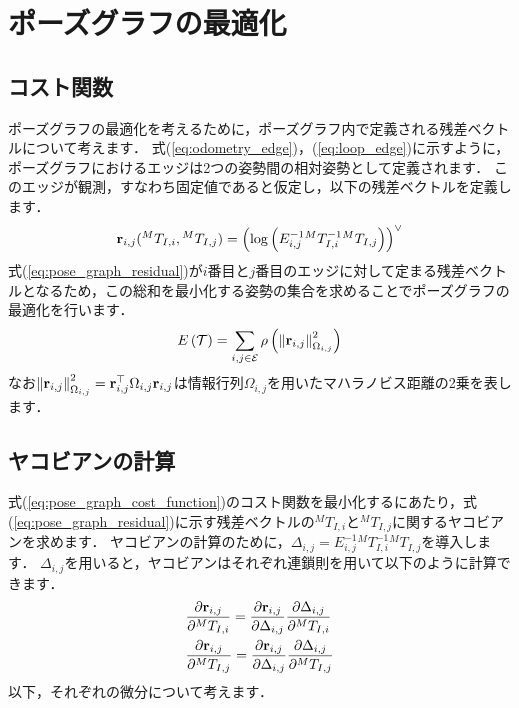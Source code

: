 \section{ポーズグラフの最適化}

\subsection{コスト関数}

ポーズグラフの最適化を考えるために，ポーズグラフ内で定義される残差ベクトルについて考えます．
式(\ref{eq:odometry_edge})，(\ref{eq:loop_edge})に示すように，ポーズグラフにおけるエッジは2つの姿勢間の相対姿勢として定義されます．
このエッジが観測，すなわち固定値であると仮定し，以下の残差ベクトルを定義します．
%
\begin{align}
  {\bf r}_{i, j}({}^{M}T_{I, i}, {}^{M}T_{I, j}) = \left( \log \left( E_{i, j}^{-1} {}^{M}T_{I, i}^{-1} {}^{M}T_{I, j} \right) \right)^{\vee}
  \label{eq:pose_graph_residual}
\end{align}
%
式(\ref{eq:pose_graph_residual})が$i$番目と$j$番目のエッジに対して定まる残差ベクトルとなるため，この総和を最小化する姿勢の集合を求めることでポーズグラフの最適化を行います．
%
\begin{align}
 E \left( \mathcal{T} \right) = \sum_{ i, j \in \mathcal{E} } \rho \left( \left\| {\bf r}_{i, j} \right\|_{ \Omega_{i, j} }^{2} \right)
  \label{eq:pose_graph_cost_function}
\end{align}
%
なお$\left\| {\bf r}_{i, j} \right\|_{ \Omega_{i, j} }^{2} = {\bf r}_{i, j}^{\top} \Omega_{i, j} {\bf r}_{i, j}$は情報行列$\Omega_{i, j}$を用いたマハラノビス距離の2乗を表します．





\subsection{ヤコビアンの計算}

式(\ref{eq:pose_graph_cost_function})のコスト関数を最小化するにあたり，式(\ref{eq:pose_graph_residual})に示す残差ベクトルの${}^{M}T_{I, i}$と${}^{M}T_{I, j}$に関するヤコビアンを求めます．
ヤコビアンの計算のために，$\Delta_{i, j} = E_{i, j}^{-1} {}^{M}T_{I, i}^{-1} {}^{M}T_{I, j}$を導入します．
$\Delta_{i, j}$を用いると，ヤコビアンはそれぞれ連鎖則を用いて以下のように計算できます．
%
\begin{align}
  \begin{split}
    & \frac{ \partial {\bf r}_{i, j} }{ \partial {}^{M}T_{I, i} }
    = \frac{ \partial {\bf r}_{i, j} }{ \partial \Delta_{i, j} }
      \frac{ \partial \Delta_{i, j} }{ \partial {}^{M}T_{I, i} } \\
%
    & \frac{ \partial {\bf r}_{i, j} }{ \partial {}^{M}T_{I, j} }
    = \frac{ \partial {\bf r}_{i, j} }{ \partial \Delta_{i, j} }
      \frac{ \partial \Delta_{i, j} }{ \partial {}^{M}T_{I, j} }
  \end{split}
\end{align}
%
以下，それぞれの微分について考えます．

